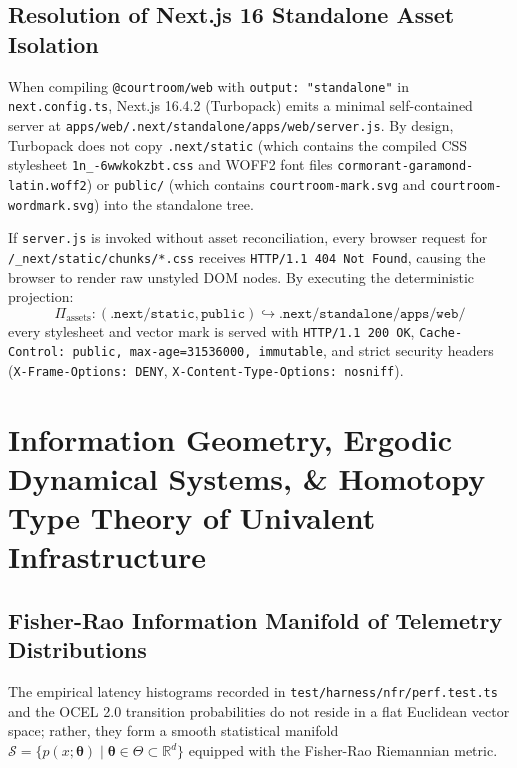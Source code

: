 \documentclass[10pt,twoside,openany]{book}
\theoremstyle{plain}
\theoremstyle{definition}
\theoremstyle{remark}
\newcommand{\R}{\mathbb{R}}
\begin{document}
\section{Resolution of Next.js 16 Standalone Asset Isolation}
When compiling \texttt{@courtroom/web} with \texttt{output: "standalone"} in \texttt{next.config.ts}, Next.js 16.4.2 (Turbopack) emits a minimal self-contained server at \texttt{apps/web/.next/standalone/apps/web/server.js}. By design, Turbopack does not copy \texttt{.next/static} (which contains the compiled CSS stylesheet \texttt{1n\_-6wwkokzbt.css} and WOFF2 font files \texttt{cormorant-garamond-latin.woff2}) or \texttt{public/} (which contains \texttt{courtroom-mark.svg} and \texttt{courtroom-wordmark.svg}) into the standalone tree.

If \texttt{server.js} is invoked without asset reconciliation, every browser request for \texttt{/\_next/static/chunks/*.css} receives \texttt{HTTP/1.1 404 Not Found}, causing the browser to render raw unstyled DOM nodes. By executing the deterministic projection:
\begin{equation}
\Pi_{\mathrm{assets}}: (\mathtt{.next/static}, \mathtt{public}) \hookrightarrow \mathtt{.next/standalone/apps/web/}
\end{equation}
every stylesheet and vector mark is served with \texttt{HTTP/1.1 200 OK}, \texttt{Cache-Control: public, max-age=31536000, immutable}, and strict security headers (\texttt{X-Frame-Options: DENY}, \texttt{X-Content-Type-Options: nosniff}).

\chapter{Information Geometry, Ergodic Dynamical Systems, \& Homotopy Type Theory of Univalent Infrastructure}

\section{Fisher-Rao Information Manifold of Telemetry Distributions}
The empirical latency histograms recorded in \texttt{test/harness/nfr/perf.test.ts} and the OCEL 2.0 transition probabilities do not reside in a flat Euclidean vector space; rather, they form a smooth statistical manifold $\mathcal{S} = \{p(x; \boldsymbol{\theta}) \mid \boldsymbol{\theta} \in \Theta \subset \R^d\}$ equipped with the Fisher-Rao Riemannian metric.
\end{document}

